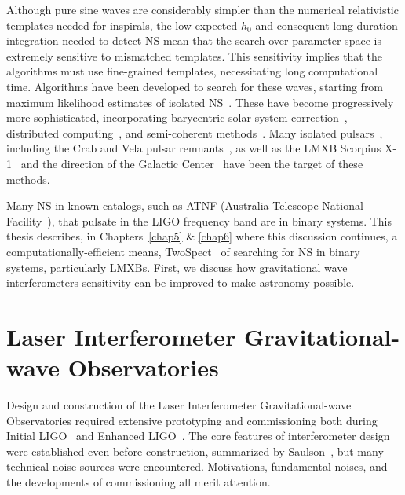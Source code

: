 Although pure sine waves are considerably simpler than the numerical relativistic templates needed for inspirals, the low expected $h_0$ and consequent long-duration integration needed to detect NS mean that the search over parameter space is extremely sensitive to mismatched templates.
This sensitivity implies that the algorithms must use fine-grained templates, necessitating long computational time.
Algorithms have been developed to search for these waves, starting from maximum likelihood estimates of isolated NS~\cite{Jaranowski1998}.
These have become progressively more sophisticated, incorporating barycentric solar-system correction~\cite{LSCPulsarS4}, distributed computing~\cite{LSCEinsteinHome2009}, and semi-coherent methods~\cite{LSCPowerFlux2009}.
Many isolated pulsars~\cite{Abbott2004,LSCPulsar2006}, including the Crab and Vela pulsar remnants~\cite{AasiPulsarInitialResults2014}, as well as the LMXB Scorpius X-1~\cite{AbbottPulsar2006} and the direction of the Galactic Center~\cite{AasiGalacticCenter2013} have been the target of these methods.

Many NS in known catalogs, such as ATNF (Australia Telescope National Facility~\cite{ManchesterATNF2005}), that pulsate in the LIGO frequency band are in binary systems.
This thesis describes, in Chapters~\ref{chap5} \& \ref{chap6} where this discussion continues, a computationally-efficient means, TwoSpect~\cite{GoetzTwoSpectMethods2011} of searching for NS in binary systems, particularly LMXBs. 
First, we discuss how gravitational wave interferometers sensitivity can be improved to make astronomy possible.

    \section{Laser Interferometer Gravitational-wave Observatories}
    \label{LIGO}
        
Design and construction of the Laser Interferometer Gravitational-wave Observatories required extensive prototyping and commissioning both during Initial LIGO~\cite{MavalvalaThesis,AdhikariThesis,BallmerThesis} and Enhanced LIGO~\cite{FrickeThesis,SmithThesis,DooleyThesis}.
The core features of interferometer design were established even before construction, summarized by Saulson~\cite{Saulson}, but many technical noise sources were encountered.
Motivations, fundamental noises, and the developments of commissioning all merit attention.

